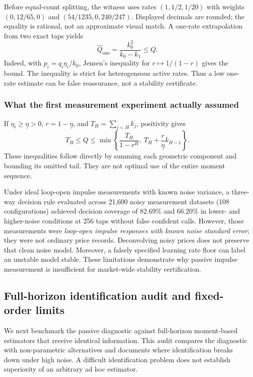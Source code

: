 \documentclass[10pt,twocolumn,letterpaper]{article}
\theoremstyle{definition}
\theoremstyle{remark}
\begin{document}
Before equal-count splitting, the witness uses rates $(1,1/2,1/20)$ with weights $(0,12/65,0)$ and $(54/1235,0,240/247)$. Displayed decimals are rounded; the equality is rational, not an approximate visual match. A one-rate extrapolation from two exact taps yields
\[
 \widehat Q_{\mathrm{one}}=\frac{k_0^2}{k_0-k_1}\le Q.
\]
Indeed, with $p_i=q_i\eta_i/k_0$, Jensen's inequality for $r\mapsto1/(1-r)$ gives the bound. The inequality is strict for heterogeneous active rates. Thus a low one-rate estimate can be false reassurance, not a stability certificate.

\subsubsection{What the first measurement experiment actually assumed}
If $\eta_i\ge\underline\eta>0$, $r=1-\underline\eta$, and $T_H=\sum_{j<H}k_j$, positivity gives
\begin{equation}
 T_H\le Q\le\min\left\{\frac{T_H}{1-r^H},\ T_H+\frac{r}{\underline\eta}k_{H-1}\right\}.
 \label{eq:retained_tail}
\end{equation}
These inequalities follow directly by summing each geometric component and bounding its omitted tail. They are not optimal use of the entire moment sequence.

Under ideal loop-open impulse measurements with known noise variance, a three-way decision rule evaluated across 21,600 noisy measurement datasets (108 configurations) achieved decision coverage of 82.69\% and 66.20\% in lower- and higher-noise conditions at 256 taps without false confident calls. However, those measurements were \emph{loop-open impulse responses with known noise standard error}; they were not ordinary price records. Deconvolving noisy prices does not preserve that clean noise model. Moreover, a falsely specified learning rate floor can label an unstable model stable. These limitations demonstrate why passive impulse measurement is insufficient for market-wide stability certification.

\subsection{Full-horizon identification audit and fixed-order limits}
\label{sec:integrated_audit}
We next benchmark the passive diagnostic against full-horizon moment-based estimators that receive identical information. This audit compares the diagnostic with non-parametric alternatives and documents where identification breaks down under high noise. A difficult identification problem does not establish superiority of an arbitrary ad hoc estimator.
\end{document}
